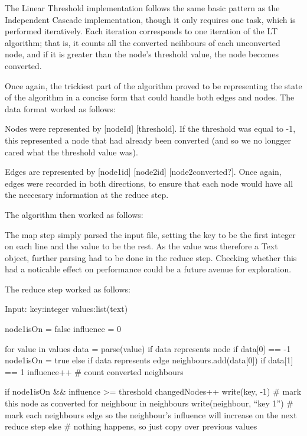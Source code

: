 The Linear Threshold implementation follows the same basic pattern as the Independent Cascade implementation, though it only requires one task, which is performed iteratively. Each iteration corresponds to one iteration of the LT algorithm; that is, it counts all the converted neihbours of each unconverted node, and if it is greater than the node's threshold value, the node becomes converted.

Once again, the trickiest part of the algorithm proved to be representing the state of the algorithm in a concise form that could handle both edges and nodes. The data format worked as follows:

Nodes were represented by [nodeId] [threshold]. If the threshold was equal to -1, this represented a node that had already been converted (and so we no longger cared what the threshold value was).

Edges are represented by [node1id] [node2id] [node2converted?]. Once again, edges were recorded in both directions, to ensure that each node would have all the neccesary information at the reduce step.

The algorithm then worked as follows:

The map step simply parsed the input file, setting the key to be the first integer on each line and the value to be the rest. As the value was therefore a Text object, further parsing had to be done in the reduce step. Checking whether this had a noticable effect on performance could be a future avenue for exploration.

The reduce step worked as follows:

Input: key:integer values:list(text)

node1isOn = false
influence = 0

for value in values {
  data = parse(value)
  if data represents node {
    if data[0] == -1 {
      node1isOn = true
    }
  } else if data represents edge {
    neighbours.add(data[0])
    if data[1] == 1 {
      influence++ # count converted neighbours
    }
  }
}

if node1isOn && influence >= threshold {
  changedNodes++
  write(key, -1) # mark this node as converted
  for neighbour in neighbours {
    write(neighbour, ``key 1'') # mark each neighbours edge so the neighbour's influence will increase on the next reduce step
  }
} else {
  # nothing happens, so just copy over previous values
}
